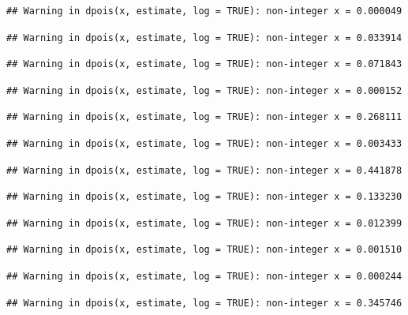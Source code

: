 \documentclass[]{article}
\begin{document}
\begin{verbatim}
## Warning in dpois(x, estimate, log = TRUE): non-integer x = 0.000049
\end{verbatim}

\begin{verbatim}
## Warning in dpois(x, estimate, log = TRUE): non-integer x = 0.033914
\end{verbatim}

\begin{verbatim}
## Warning in dpois(x, estimate, log = TRUE): non-integer x = 0.071843
\end{verbatim}

\begin{verbatim}
## Warning in dpois(x, estimate, log = TRUE): non-integer x = 0.000152
\end{verbatim}

\begin{verbatim}
## Warning in dpois(x, estimate, log = TRUE): non-integer x = 0.268111
\end{verbatim}

\begin{verbatim}
## Warning in dpois(x, estimate, log = TRUE): non-integer x = 0.003433
\end{verbatim}

\begin{verbatim}
## Warning in dpois(x, estimate, log = TRUE): non-integer x = 0.441878
\end{verbatim}

\begin{verbatim}
## Warning in dpois(x, estimate, log = TRUE): non-integer x = 0.133230
\end{verbatim}

\begin{verbatim}
## Warning in dpois(x, estimate, log = TRUE): non-integer x = 0.012399
\end{verbatim}

\begin{verbatim}
## Warning in dpois(x, estimate, log = TRUE): non-integer x = 0.001510
\end{verbatim}

\begin{verbatim}
## Warning in dpois(x, estimate, log = TRUE): non-integer x = 0.000244
\end{verbatim}

\begin{verbatim}
## Warning in dpois(x, estimate, log = TRUE): non-integer x = 0.345746
\end{verbatim}
\end{document}
